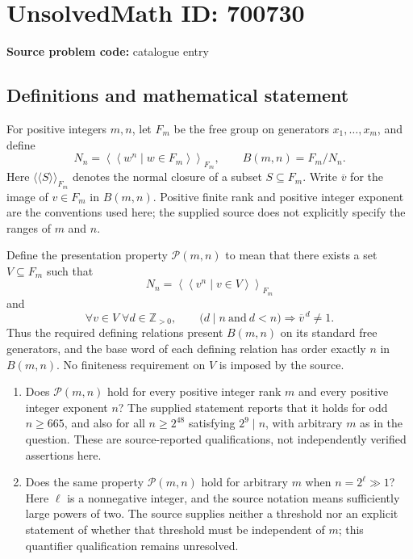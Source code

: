 \documentclass[11pt]{article}
\begin{document}
\section*{UnsolvedMath ID: 700730}
\textbf{Source problem code:} catalogue entry
\subsection{Definitions and mathematical statement}
For positive integers \(m,n\), let \(F_m\) be the free group on generators \(x_1,\ldots,x_m\), and define
\[
N_n=\left\langle\!\left\langle w^n\mid w\in F_m\right\rangle\!\right\rangle_{F_m},
\qquad B(m,n)=F_m/N_n.
\]
Here \(\langle\!\langle S\rangle\!\rangle_{F_m}\) denotes the normal closure of a subset \(S\subseteq F_m\). Write \(\overline v\) for the image of \(v\in F_m\) in \(B(m,n)\). Positive finite rank and positive integer exponent are the conventions used here; the supplied source does not explicitly specify the ranges of \(m\) and \(n\).

Define the presentation property \(\mathcal P(m,n)\) to mean that there exists a set \(V\subseteq F_m\) such that
\[
N_n=\left\langle\!\left\langle v^n\mid v\in V\right\rangle\!\right\rangle_{F_m}
\]
and
\[
\forall v\in V\;\forall d\in\mathbb Z_{>0},\qquad
\bigl(d\mid n\ \text{and}\ d<n\bigr)
\Longrightarrow \overline v^{\,d}\ne 1.
\]
Thus the required defining relations present \(B(m,n)\) on its standard free generators, and the base word of each defining relation has order exactly \(n\) in \(B(m,n)\). No finiteness requirement on \(V\) is imposed by the source.

\begin{enumerate}
\item[(a)] Does \(\mathcal P(m,n)\) hold for every positive integer rank \(m\) and every positive integer exponent \(n\)? The supplied statement reports that it holds for odd \(n\geq665\), and also for all \(n\geq2^{48}\) satisfying \(2^9\mid n\), with arbitrary \(m\) as in the question. These are source-reported qualifications, not independently verified assertions here.
\item[(b)] Does the same property \(\mathcal P(m,n)\) hold for arbitrary \(m\) when \(n=2^\ell\gg1\)? Here \(\ell\) is a nonnegative integer, and the source notation means sufficiently large powers of two. The source supplies neither a threshold nor an explicit statement of whether that threshold must be independent of \(m\); this quantifier qualification remains unresolved.
\end{enumerate}
\end{document}
